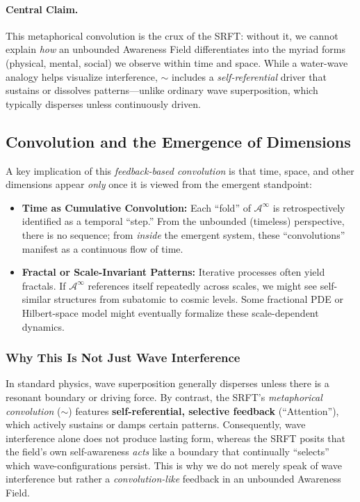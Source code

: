 \documentclass[12pt,a4paper]{article}
\begin{document}
\paragraph{Central Claim.}
This metaphorical convolution is the crux of the SRFT: without it, we cannot explain 
\emph{how} an unbounded Awareness Field differentiates into the myriad forms (physical, 
mental, social) we observe within time and space. While a water-wave analogy 
helps visualize interference, \(\sim\) includes a \emph{self-referential} driver that 
sustains or dissolves patterns—unlike ordinary wave superposition, which typically disperses 
unless continuously driven.

\subsection{Convolution and the Emergence of Dimensions}
\label{subsec:emergent-dimensions}

A key implication of this \emph{feedback-based convolution} is that time, space, and other dimensions 
appear \emph{only} once it is viewed from the emergent standpoint:
\begin{itemize}
    \item \textbf{Time as Cumulative Convolution:} 
    Each “fold” of \(\mathscr{A}^\infty\) is retrospectively identified as a temporal ``step.'' 
    From the unbounded (timeless) perspective, there is no sequence; from \emph{inside} the 
    emergent system, these “convolutions” manifest as a continuous flow of time.

    \item \textbf{Fractal or Scale-Invariant Patterns:} 
    Iterative processes often yield fractals. If \(\mathscr{A}^\infty\) references itself 
    repeatedly across scales, we might see self-similar structures from subatomic 
    to cosmic levels. Some fractional PDE or Hilbert-space model might eventually formalize 
    these scale-dependent dynamics.
\end{itemize}

\subsubsection{Why This Is Not Just Wave Interference}
\label{subsec:not-just-wave-interference}

In standard physics, wave superposition generally disperses unless there is a resonant boundary 
or driving force. By contrast, the SRFT’s \emph{metaphorical convolution} (\(\sim\)) features 
\textbf{self-referential, selective feedback} (``Attention''), which actively sustains or 
damps certain patterns. Consequently, wave interference alone does not produce lasting form, 
whereas the SRFT posits that the field’s own self-awareness \emph{acts} like a boundary 
that continually “selects” which wave-configurations persist. This is why we do not merely 
speak of wave interference but rather a \emph{convolution-like} feedback in an unbounded 
Awareness Field.
\end{document}
